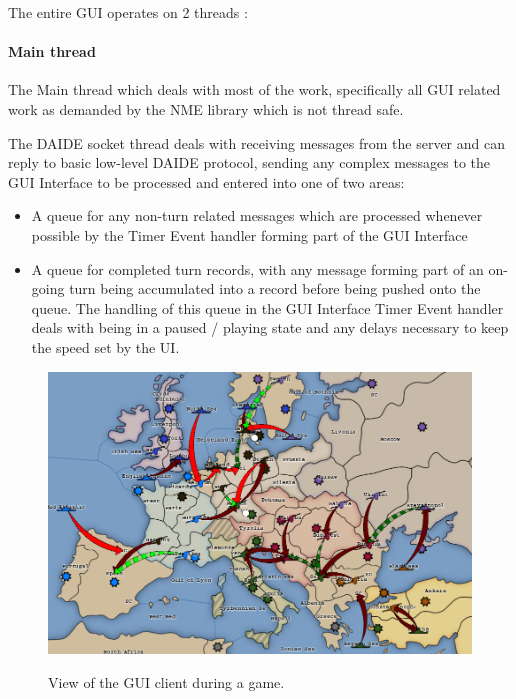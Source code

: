 The entire GUI operates on 2 threads :

\paragraph{Main thread}
The Main thread which deals with most of the work, specifically all
GUI related work as demanded by the NME library which is not thread
safe.

The DAIDE socket thread deals with receiving messages from the server
and can reply to basic low-level DAIDE protocol, sending any complex
messages to the GUI Interface to be processed and entered into one of
two areas:

\begin{itemize}

\item A queue for any non-turn related messages which are processed
      whenever possible by the Timer Event handler forming part of
      the GUI Interface
\item A queue for completed turn records, with any message forming
      part of an on-going turn being accumulated into a record before
      being pushed onto the queue. The handling of this queue in the
      GUI Interface Timer Event handler deals with being in a paused /
      playing state and any delays necessary to keep the speed set by 
      the UI.

\end{itemize}

\begin{figure}

\includegraphics[scale=0.4]{./screenshots/TitleScreen.png}

View of the GUI client during a game.

\end{figure}


